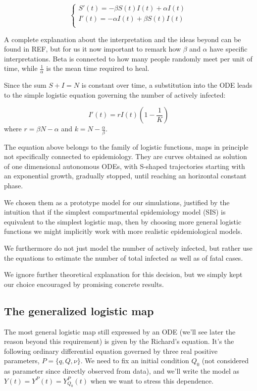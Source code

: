 \documentclass[9pt]{article}
\begin{document}
\begin{equation}
\begin{cases}
	S'(t) = - \beta S(t) I(t) + \alpha I(t) \\
	I'(t) = - \alpha I(t) + \beta S(t) I(t) \\
\end{cases}
\end{equation}


A complete explanation about the interpretation and the ideas beyond can be
found in REF, but for us it now important to remark how $\beta$ and $\alpha$
have specific interpretations. Beta is connected to how many 
people randomly meet per unit of time,
while $\frac{1}{\alpha}$ is the mean time required to heal. 


Since the sum $S + I = N$ is constant over time, a substitution
into the ODE leads to the simple logistic equation governing the number of
actively infected:

\begin{equation}
	I' (t) = r I(t) \left (1 - \frac{1}{K} \right)
\end{equation}
where $r = \beta N - \alpha$ and $k = N - \frac{\alpha}{\beta}$.


The equation above belongs to the family of logistic functions, maps
in principle not specifically connected to epidemiology. They are curves
obtained as solution of one dimensional
autonomous ODEs, with S-shaped trajectories starting with an exponential
growth, gradually stopped, until reaching an horizontal constant phase.


We chosen them as a prototype model for our simulations,
justified by the intuition that if the simplest compartmental
epidemiology model (SIS) is equivalent to the simplest logistic map,
then by choosing more general logistic functions we might implicitly
work with more realistic epidemiological models.


We furthermore do not just model the number of actively infected,
but rather use the equations to estimate the number of total infected
as well as of fatal cases.

We ignore further theoretical explanation for this decision,
but we simply
kept our choice encouraged by promising concrete results.

\subsection {The generalized logistic map}
The most general logistic map still expressed by an ODE
(we'll see later the reason beyond this requirement)
is given by the Richard's equation.
It's the following ordinary differential equation governed by
three real positive parameters, 
$P = \{ q, Q, \nu \}$. We need to fix an initial condition $Q_0$
(not considered as parameter since directly observed from data),
and we'll write the model as $Y(t) = Y^P(t) = Y^P_{Q_0}(t)$
when we want to stress this dependence.
\end{document}
